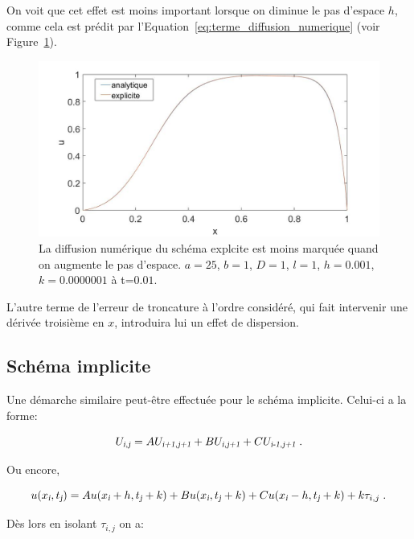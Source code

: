 \documentclass[a4paper, 12pt]{report}
\begin{document}
On voit que cet effet est moins important lorsque on diminue le pas d'espace $h$,
comme cela est prédit par l'Equation~\ref{eq:terme_diffusion_numerique} (voir Figure~\ref{eq:expl_diff_num}).

\begin{figure}[H]
  \center
  \includegraphics[scale=0.4]{images/expl_diffusion_num.jpg}
  \caption{La diffusion numérique du schéma explcite est moins marquée quand on augmente le pas d'espace. $a=25$, $b=1$, $D=1$,
  $l=1$, $h=0.001$, $k = 0.0000001$ à t=$0.01$.}
  \label{eq:expl_diff_num}
\end{figure}

L'autre terme de l'erreur de troncature à l'ordre considéré, qui fait intervenir une dérivée troisième
en $x$, introduira lui un effet de dispersion.

\subsection*{Schéma implicite}

Une démarche similaire peut-être effectuée pour le schéma implicite. Celui-ci
a la forme:

\begin{equation}
  U_{\textsl{i},\textsl{j}} = A U_{\textsl{i+1},\textsl{j+1}} +  B U_{\textsl{i},\textsl{j+1}} + C U_{\textsl{i-1},\textsl{j+1}}\;.
\end{equation}

Ou encore,

\begin{equation}
u(x_{\textsl{i}}, t_{\textsl{j}}) = A u(x_{\textsl{i}}+h, t_{\textsl{j}}+k) + B u(x_{\textsl{i}}, t_{\textsl{j}}+k) + C u(x_{\textsl{i}}-h, t_{\textsl{j}}+k) + k \tau_{i,j}\;.
\end{equation}

Dès lors en isolant $\tau_{i,j}$ on a:
\end{document}
